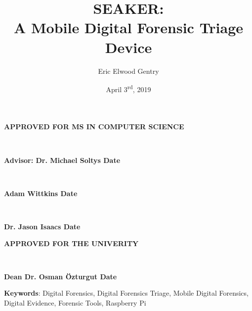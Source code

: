 \documentclass[12pt]{article}
\newcommand{\A}{\mathcal{A}}
\begin{document}
\begin{center}
{\large \bfseries APPROVED FOR MS IN COMPUTER SCIENCE \par}

\vspace{1.5 cm}

\hrulefill\\
{\large \bfseries Advisor: Dr. Michael Soltys \hfill Date \par}

\vspace{1.5 cm}

\hrulefill\\
{\large \bfseries Adam Wittkins \hfill Date \par}

\vspace{1.5 cm}

\hrulefill\\
{\large \bfseries Dr. Jason Isaacs \hfill Date \par}

\vspace{3 cm}

{\large \bfseries APPROVED FOR THE UNIVERITY \par}

\vspace{1.5 cm}

\hrulefill\\
{\large \bfseries Dean Dr. Osman \"{O}zturgut \hfill Date \par}
\end{center}

\newpage



\newpage

\title{SEAKER:\protect\\A Mobile Digital Forensic Triage Device} 
\author{Eric Elwood Gentry}

\date{April 3\textsuperscript{rd}, 2019}
\maketitle

\small{\textbf{Keywords}: Digital Forensics, Digital Forensics Triage, Mobile Digital Forensics,
Digital Evidence, Forensic Tools, Raspberry Pi}
\\
\end{document}
